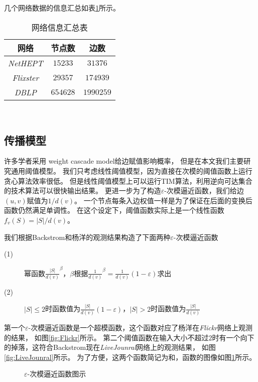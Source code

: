 几个网络数据的信息汇总如表\ref{tab:net_info}所示。
\begin{table}[h]
	\centering
	\caption{网络信息汇总表}
	\label{tab:net_info}
	\begin{minipage}[t]{0.8\textwidth} 
		\centering
		\begin{tabular}{|c|c|c|}
			\hline
			网络  &  节点数   &   边数\\ \hline
			{\em NetHEPT}  &  $15233$   &   $31376$ \\ \hline
			{\em Flixster}  &  $29357$   &   $174939$ \\ \hline
			{\em DBLP}   &   $654628$   &   $1990259$ \\
			\hline
		\end{tabular}\\[2pt]
	\end{minipage}
\end{table}

\subsection{传播模型}
许多学者采用 weight cascade model\cite{Kempe2003maximizing}给边赋值影响概率，
但是在本文我们主要研究通用阈值模型。
我们只考虑线性阈值模型\cite{Kempe2003maximizing}，因为直接在次模的阈值函数上运行贪心算法效率很低。
但是线性阈值模型上可以运行TIM算法，利用逆向可达集合的技术算法可以很快输出结果。
更进一步为了构造$\varepsilon$-次模逼近函数，我们给边$(u,v)$赋值为$1/d(v)$。
一个节点每条入边权值一样是为了保证在后面的变换后函数仍然满足单调性。
在这个设定下，阈值函数实际上是一个线性函数$f_v(S) = |S|/d(v)$。

我们根据Backstrom\cite{backstrom2006group}和杨洋\cite{yang2016role}的观测结果构造了下面两种$\varepsilon$-次模逼近函数
\begin{description}
\item[(1)] 幂函数$\frac{|S|}{d(v)}^{\beta}$，$\beta$根据$\frac{1}{d(v)}^{\beta}=\frac{1}{d(v)}(1-\varepsilon)$求出
\item[(2)] $|S| \leq 2$时函数值为$\frac{|S|}{d(v)}(1-\varepsilon)$，$|S| > 2$时函数值为$\frac{|S|}{d(v)}$
\end{description}
第一个$\varepsilon$-次模逼近函数是一个超模函数，这个函数对应了杨洋\cite{yang2016role}在{\em Flickr}网络上观测的结果，
如图\ref{fig:Flickr}所示。
第二个阈值函数在输入大小不超过$2$时有一个向下的掉落，这符合Backstrom\cite{backstrom2006group}现在{\em LiveJounral}网络上的观测结果，
如图\ref{fig:LiveJounral}所示。
为了方便，这两个函数简记为\easso 和\easst ，函数的图像如图\ref{fig:eas12}所示。
\begin{figure}[h]
\centering
	\caption{$\varepsilon$-次模逼近函数图示}
	\label{fig:eas12}
\end{figure}

